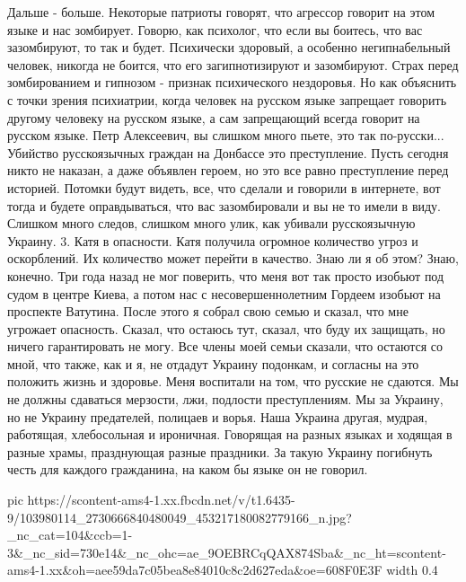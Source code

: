 Дальше - больше. Некоторые патриоты говорят, что агрессор говорит на этом языке и нас зомбирует. Говорю, как психолог, что если вы боитесь, что вас зазомбируют, то так и будет. Психически здоровый, а особенно негипнабельный человек, никогда не боится, что его загипнотизируют и зазомбируют. Страх перед зомбированием и гипнозом - признак психического нездоровья. 
Но как объяснить с точки зрения психиатрии, когда человек на русском языке запрещает говорить другому человеку на русском языке, а сам запрещающий всегда говорит на русском языке. Петр Алексеевич, вы слишком много пьете, это так по-русски...
Убийство русскоязычных граждан на Донбассе это преступление. Пусть сегодня никто не наказан, а даже объявлен героем, но это все равно преступление перед историей. Потомки будут видеть, все, что сделали и говорили в интернете, вот тогда и будете оправдываться, что вас зазомбировали и вы не то имели в виду. Слишком много следов, слишком много улик, как убивали русскоязычную Украину. 
3. Катя в опасности.
Катя получила огромное количество угроз и оскорблений. Их количество может перейти в качество. Знаю ли я об этом? Знаю, конечно. Три года назад не мог поверить, что меня вот так просто изобьют под судом в центре Киева, а потом нас с несовершеннолетним Гордеем изобьют на проспекте Ватутина. 
После этого я собрал свою семью и сказал, что мне угрожает опасность. Сказал, что остаюсь тут, сказал, что буду их защищать, но ничего гарантировать не могу. Все члены моей семьи сказали, что остаются со мной, что также, как и я, не отдадут Украину подонкам, и согласны на это положить жизнь и здоровье.  
Меня воспитали на том, что русские не сдаются. Мы не должны сдаваться мерзости, лжи, подлости преступлениям. Мы за Украину, но не Украину предателей, полицаев и ворья. Наша Украина другая, мудрая, работящая, хлебосольная и ироничная. Говорящая на разных языках и ходящая в разные храмы, празднующая разные праздники. За такую Украину погибнуть честь для каждого гражданина, на каком бы языке он не говорил.

\ifcmt
  pic https://scontent-ams4-1.xx.fbcdn.net/v/t1.6435-9/103980114_2730666840480049_453217180082779166_n.jpg?_nc_cat=104&ccb=1-3&_nc_sid=730e14&_nc_ohc=ae_9OEBRCqQAX874Sba&_nc_ht=scontent-ams4-1.xx&oh=aee59da7c05bea8e84010c8c2d627eda&oe=608F0E3F
  width 0.4
\fi

